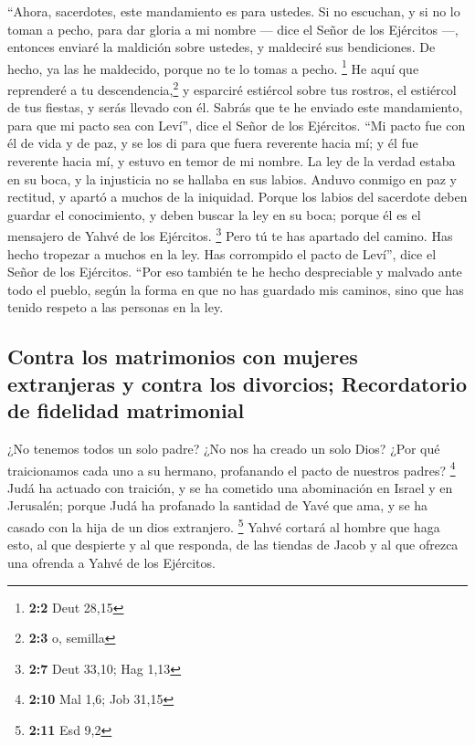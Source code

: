  ``Ahora, sacerdotes, este mandamiento es para ustedes.
 Si no escuchan, y si no lo toman a pecho, para dar gloria
a mi nombre --- dice el Señor de los Ejércitos ---, entonces enviaré la
maldición sobre ustedes, y maldeciré sus bendiciones. De hecho, ya las
he maldecido, porque no te lo tomas a pecho. \footnote{\textbf{2:2} Deut
  28,15}  He aquí que reprenderé a tu
descendencia,\footnote{\textbf{2:3} o, semilla} y esparciré estiércol
sobre tus rostros, el estiércol de tus fiestas, y serás llevado con él.
 Sabrás que te he enviado este mandamiento, para que mi
pacto sea con Leví'', dice el Señor de los Ejércitos. 
``Mi pacto fue con él de vida y de paz, y se los di para que fuera
reverente hacia mí; y él fue reverente hacia mí, y estuvo en temor de mi
nombre.  La ley de la verdad estaba en su boca, y la
injusticia no se hallaba en sus labios. Anduvo conmigo en paz y
rectitud, y apartó a muchos de la iniquidad.  Porque los
labios del sacerdote deben guardar el conocimiento, y deben buscar la
ley en su boca; porque él es el mensajero de Yahvé de los Ejércitos.
\footnote{\textbf{2:7} Deut 33,10; Hag 1,13}  Pero tú te
has apartado del camino. Has hecho tropezar a muchos en la ley. Has
corrompido el pacto de Leví'', dice el Señor de los Ejércitos.
 ``Por eso también te he hecho despreciable y malvado ante
todo el pueblo, según la forma en que no has guardado mis caminos, sino
que has tenido respeto a las personas en la ley.

\hypertarget{contra-los-matrimonios-con-mujeres-extranjeras-y-contra-los-divorcios-recordatorio-de-fidelidad-matrimonial}{%
\subsection{Contra los matrimonios con mujeres extranjeras y contra los
divorcios; Recordatorio de fidelidad
matrimonial}\label{contra-los-matrimonios-con-mujeres-extranjeras-y-contra-los-divorcios-recordatorio-de-fidelidad-matrimonial}}

 ¿No tenemos todos un solo padre? ¿No nos ha creado un
solo Dios? ¿Por qué traicionamos cada uno a su hermano, profanando el
pacto de nuestros padres? \footnote{\textbf{2:10} Mal 1,6; Job 31,15}
 Judá ha actuado con traición, y se ha cometido una
abominación en Israel y en Jerusalén; porque Judá ha profanado la
santidad de Yavé que ama, y se ha casado con la hija de un dios
extranjero. \footnote{\textbf{2:11} Esd 9,2}  Yahvé
cortará al hombre que haga esto, al que despierte y al que responda, de
las tiendas de Jacob y al que ofrezca una ofrenda a Yahvé de los
Ejércitos.

